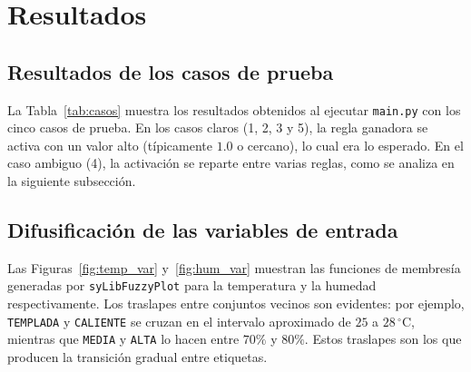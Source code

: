 \documentclass[conference]{IEEEtran}
\begin{document}
\section{Resultados}

\subsection{Resultados de los casos de prueba}
La Tabla~\ref{tab:casos} muestra los resultados obtenidos al ejecutar \texttt{main.py} con los cinco casos de prueba. En los casos claros (1, 2, 3 y 5), la regla ganadora se activa con un valor alto (típicamente \(1.0\) o cercano), lo cual era lo esperado. En el caso ambiguo (4), la activación se reparte entre varias reglas, como se analiza en la siguiente subsección.

\begin{table}[htbp]
\centering
\caption{Casos de prueba y resultados.}
\label{tab:casos}
\end{table}

\subsection{Difusificación de las variables de entrada}
Las Figuras~\ref{fig:temp_var} y~\ref{fig:hum_var} muestran las funciones de membresía generadas por \texttt{syLibFuzzyPlot} para la temperatura y la humedad respectivamente. Los traslapes entre conjuntos vecinos son evidentes: por ejemplo, \texttt{TEMPLADA} y \texttt{CALIENTE} se cruzan en el intervalo aproximado de \(25\) a \(28\,^\circ\)C, mientras que \texttt{MEDIA} y \texttt{ALTA} lo hacen entre \(70\%\) y \(80\%\). Estos traslapes son los que producen la transición gradual entre etiquetas.
\end{document}
